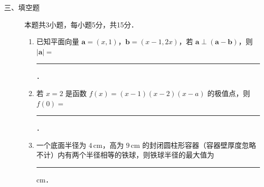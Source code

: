 \begin{description}
    \item[三、填空题] 本题共3小题，每小题5分，共15分．
    \begin{enumerate}[leftmargin=5pt]
      \addtocounter{enumi}{+11}
        \item 已知平面向量 $\bm a=(x,1)$，$\bm b=(x-1,2x)$，若 $\bm a\perp(\bm a-\bm b)$，则 $|\bm a|=$ \rule[-0.3ex]{3em}{0.4pt}．
        \item 若 $x=2$ 是函数 $f(x)=(x-1)(x-2)(x-a)$ 的极值点，则 $f(0)=$ \rule[-0.3ex]{3em}{0.4pt}．
        \item 一个底面半径为 $4\,\text{cm}$，高为 $9\,\text{cm}$ 的封闭圆柱形容器（容器壁厚度忽略不计）内有两个半径相等的铁球，则铁球半径的最大值为 \rule[-0.3ex]{3em}{0.4pt} cm．
    \end{enumerate}
\end{description}

